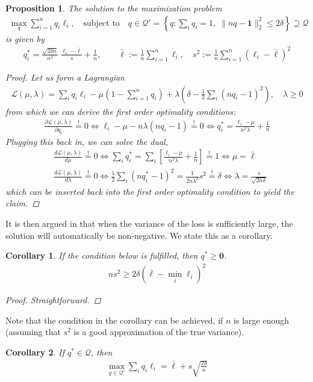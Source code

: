 \documentclass{article}
\newtheorem{proposition}{Proposition}
\newtheorem{corollary}{Corollary}
\begin{document}
\begin{proposition} 
The solution to the maximization problem 
\begin{align}
\max_q \sum_{i=1}^n q_i \ell_i, \quad  \text{subject to} \quad q \in \mathcal Q' = \left\{ q: \sum_i q_i  = 1, \; \| n q - \mathbf 1\|^2_2 \le 2\delta \right\}  \supseteq \mathcal Q
\end{align}
is given by 
\begin{align}
q^*_i = \frac{\sqrt{2 \delta n}}{n^2}  \; \frac{\ell_i - \bar \ell}{s} +  \frac 1n, \qquad 
\bar \ell := \frac 1n \sum_{i=1}^n \ell_i, \quad 
s^2 := \frac 1n \sum_{i=1}^n (\ell_i - \bar \ell)^2
\end{align}
\begin{proof}
Let us form a Lagrangian
\begin{align}
\mathcal L(\mu, \lambda) = \sum_i q_i \ell_i - \mu \left(1- \sum_{i=1}^n q_i \right) + \lambda \left( \delta - \tfrac 12 \sum_i (n q_i - 1)^2 \right),\quad \lambda \ge 0 
\end{align}
from which we can derive the first order optimality conditions:
\begin{align}
\frac{\partial \mathcal L(\mu, \lambda)}{\partial q_i} \stackrel !=0 \iff \ell_i -\mu  - n \lambda (n q_i -1) \stackrel != 0 \iff q_i^*  = \frac{\ell_i - \mu} {n^2 \lambda} + \frac 1n
\end{align}
Plugging this back in, we can solve the dual, 
\begin{align}
& \frac{d \mathcal L (\mu,\lambda)}{d\mu} \stackrel !=0 \iff 
\sum_i q_i^* = \sum_i \left[ \frac{\ell_i - \mu} {n^2 \lambda} + \frac 1n \right] \stackrel !=1 \iff \mu = \bar \ell  \\
& \frac{d \mathcal L (\mu,\lambda)}{d\lambda} \stackrel !=0 \iff 
\frac 12 \sum_i (nq_i^*-1)^2 = \frac{1}{2n \lambda^2} s^2 \stackrel != \delta \iff \lambda = \frac{s}{\sqrt{2 n \delta}}
\end{align}
which can be inserted back into the first order optimality condition to yield the claim.
\end{proof}
\end{proposition}
It is then argued in \cite{namkoong2017variance} that when the variance of the loss is sufficiently large, the solution will automatically be non-negative.  We state this as a corollary.
\begin{corollary}
If the condition below is fulfilled, then  $q^* \geq \mathbf 0$. 
\begin{align}
n s^2 \ge 2 \delta \left( \bar \ell - \min_i   \ell_i \right)^2
\end{align}
\begin{proof}
Straightforward. 
\end{proof}
\end{corollary}
\noindent Note that the condition in the corollary can be achieved, if $n$ is large enough (assuming that $s^2$ is a good approximation of the true variance).
\begin{corollary}
If $q^* \in \mathcal Q$, then 
\begin{align}
\max_{q \in \mathcal Q'} \sum_i q_i \ell_i 
= \bar \ell +  s \sqrt{\frac{2 \delta}n} 
\end{align}
\end{corollary}
\end{document}
